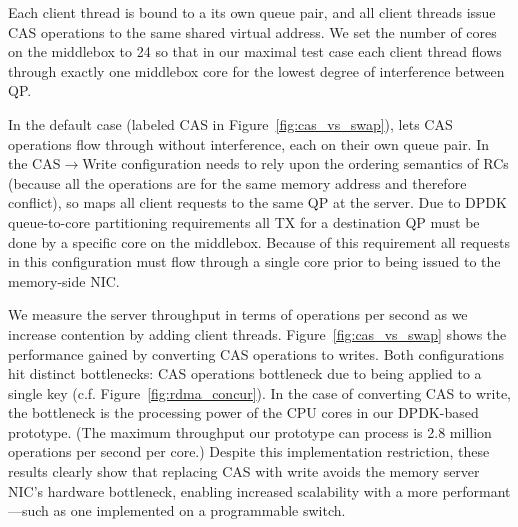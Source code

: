Each client thread is bound to a its own queue pair, and all client
threads issue CAS operations to the same shared virtual address.  We
set the number of cores on the {\sword} middlebox to 24 so that in our maximal
test case each client thread flows through exactly one middlebox core
for the lowest degree of interference between QP.

In the default case (labeled CAS in Figure~\ref{fig:cas_vs_swap}),
{\sword} lets CAS operations flow through without interference, each
on their own queue pair.  In the CAS$\rightarrow$Write configuration
{\sword} needs to rely upon the ordering semantics of RCs (because all
the operations are for the same memory address and therefore
conflict), so maps all client requests to the same QP at the server.
Due to DPDK queue-to-core partitioning requirements all TX for a
destination QP must be done by a specific core on the
middlebox. Because of this requirement all requests in this
configuration must flow through a single core prior to being issued to
the memory-side NIC.


We measure the server throughput in terms of operations per second as
we increase contention by adding client threads.
Figure~\ref{fig:cas_vs_swap} shows the performance gained by
converting CAS operations to writes. Both configurations hit distinct
bottlenecks: CAS operations bottleneck due to being applied to a
single key (c.f. Figure~\ref{fig:rdma_concur}). In the case of
converting CAS to write, the bottleneck is the processing power of the
CPU cores in our DPDK-based {\sword} prototype. (The maximum throughput
our prototype can process is 2.8 million operations per second per
core.)
Despite this implementation restriction, these results clearly show that
replacing CAS with write avoids the memory server NIC's hardware
bottleneck, enabling increased scalability with a more performant
{\sword}---such as one implemented on a programmable switch.
